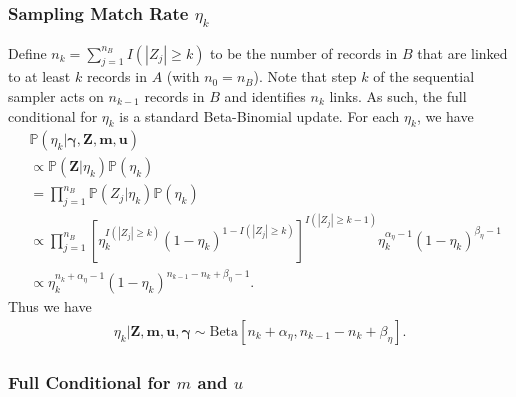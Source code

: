 \documentclass[12pt,letterpaper]{article}
\newcommand{\1}[1]{\mathbb{I}\!\left[#1\right]} %
\begin{document}

\subsubsection{Sampling Match Rate $\eta_k$}\label{app:sample-eta}

Define $n_k = \sum_{j=1}^{n_B} I\left(|Z_j| \geq k\right)$ to be the number of records in $B$ that are linked to at least $k$ records in $A$ (with $n_0 = n_B$). Note that step $k$ of the sequential sampler acts on $n_{k-1}$ records in $B$ and identifies $n_k$ links. As such, the full conditional for $\eta_k$ is a standard Beta-Binomial update. For each $\eta_k$, we have
\begin{align}\label{eqn:eta-full-conditional}
	&\mathbb{P}\left(\eta_k \big| \bm{\gamma}, \bm{Z}, \bm{m}, \bm{u}\right) \\
	&\propto \mathbb{P}\left(\bm{Z}| \eta_k\right) \mathbb{P}(\eta_k) \\
	&=\prod_{j=1}^{n_B} \mathbb{P}\left(Z_{j} | \eta_k\right) \mathbb{P}(\eta_k) \\
	&\propto \prod_{j=1}^{n_B} \left[\eta_k^{I\left(|Z_j| \geq k \right)} (1 - \eta_k)^{1 - I\left(|Z_j| \geq k \right)}\right]^{I\left(|Z_j| \geq k-1 \right)} \eta_k^{\alpha_{\eta} - 1}(1 - \eta_k)^{\beta_{\eta} - 1} \\
	&\propto \eta_k^{n_{k} + \alpha_{\eta} - 1} (1 - \eta_k)^{n_{k-1} - n_{k} + \beta_{\eta} - 1}.
\end{align}
Thus we have
\begin{align}
	\eta_k |\bm{Z}, \bm{m}, \bm{u}, \bm{\gamma} \sim \text{Beta}\left[n_{k} + \alpha_{\eta}, n_{k-1} - n_{k} + \beta_{\eta} \right].
\end{align}

\subsubsection{Full Conditional for $m$ and $u$}\label{app:derive-m-u}
\end{document}
